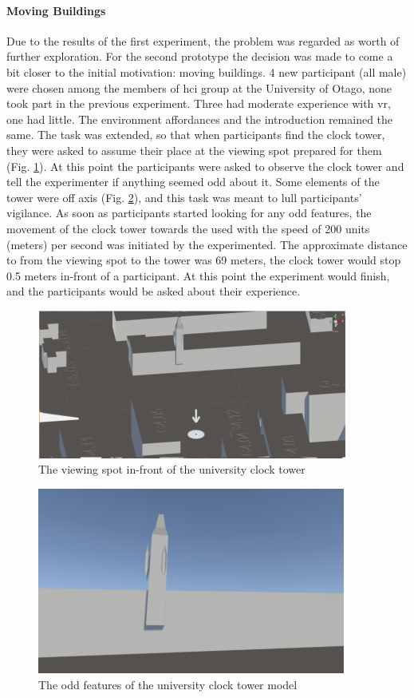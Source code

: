 \paragraph{Moving Buildings}
Due to the results of the first experiment, the problem was regarded as worth of further exploration. For the second prototype the decision was made to come a bit closer to the initial motivation: moving buildings.
4 new participant (all male) were chosen among the members of \gls{hci} group at the University of Otago, none took part in the previous experiment. Three had moderate experience with \gls{vr}, one had little.
The environment affordances and the introduction remained the same. The task was extended, so that when participants find the clock tower, they were asked to assume their place at the viewing spot prepared for them (Fig. \ref{fig:prototype2viewvingspot}). At this point the participants were asked to observe the clock tower and tell the experimenter if anything seemed odd about it. Some elements of the tower were off axis (Fig. \ref{fig:prototype2clocktoweroddfeatures}), and this task was meant to lull participants' vigilance. As soon as participants started looking for any odd features, the movement of the clock tower towards the used with the speed of 200 units (meters) per second was initiated by the experimented. The approximate distance to from the viewing spot to the tower was 69 meters, the clock tower would stop 0.5 meters in-front of a participant. At this point the experiment would finish, and the participants would be asked about their experience.
\begin{figure}
	\centering
	\includegraphics[width=0.7\linewidth]{figures/placeholders/prototype2_viewving_spot}
	\caption{The viewing spot in-front of the university clock tower}
	\label{fig:prototype2viewvingspot}
\end{figure}
\begin{figure}
	\centering
	\includegraphics[width=0.7\linewidth]{figures/placeholders/prototype2_clocktower_odd_features}
	\caption{The odd features of the university clock tower model}
	\label{fig:prototype2clocktoweroddfeatures}
\end{figure}
